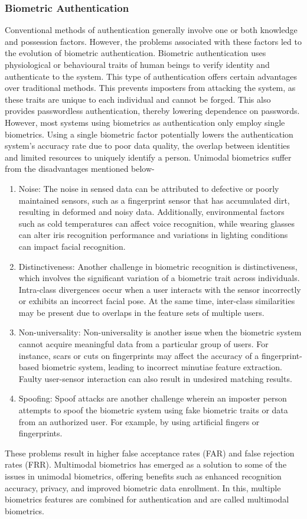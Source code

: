 \documentclass[10pt,journal,compsoc]{IEEEtran}
\begin{document}
      \subsubsection{Biometric Authentication}
      Conventional methods of authentication generally involve one or both knowledge and possession factors. However, the problems associated with these factors led to the evolution of biometric authentication.
      Biometric authentication uses physiological or behavioural traits of human beings to verify identity and authenticate to the system. This type of authentication offers certain advantages over traditional methods. This prevents imposters from attacking the system, as these traits are unique to each individual and cannot be forged. This also provides passwordless authentication, thereby lowering dependence on passwords. However, most systems using biometrics as authentication only employ single biometrics. Using a single biometric factor potentially lowers the authentication system’s accuracy rate due to poor data quality, the overlap between identities and limited resources to uniquely identify a person. Unimodal biometrics suffer from the disadvantages mentioned below-
    \begin{enumerate}
        \item Noise: The noise in sensed data can be attributed to defective or poorly maintained sensors, such as a fingerprint sensor that has accumulated dirt, resulting in deformed and noisy data. Additionally, environmental factors such as cold temperatures can affect voice recognition, while wearing glasses can alter iris recognition performance and variations in lighting conditions can impact facial recognition.
        \item Distinctiveness: Another challenge in biometric recognition is distinctiveness, which involves the significant variation of a biometric trait across individuals. Intra-class
divergences occur when a user interacts with the sensor incorrectly or exhibits an incorrect facial pose. At the same time, inter-class similarities may be present due to overlaps in
the feature sets of multiple users.
\item Non-universality: Non-universality is another issue when the biometric system cannot acquire
meaningful data from a particular group of users. For instance, scars or cuts on fingerprints may affect the accuracy of a fingerprint-based biometric system, leading to incorrect minutiae feature extraction. Faulty user-sensor interaction can also result in undesired matching results.
\item  Spoofing: Spoof attacks are another challenge wherein an imposter person attempts to spoof the biometric system using fake biometric traits or data from an authorized user. For example, by using artificial fingers or fingerprints.
    \end{enumerate}
These problems result in higher false acceptance rates (FAR) and false rejection rates (FRR). Multimodal biometrics has emerged as a solution to some of the issues in unimodal biometrics, offering benefits such as enhanced recognition accuracy, privacy, and improved biometric data
enrollment. In this, multiple biometrics features are combined for authentication and are called multimodal biometrics.
      
\end{document}
